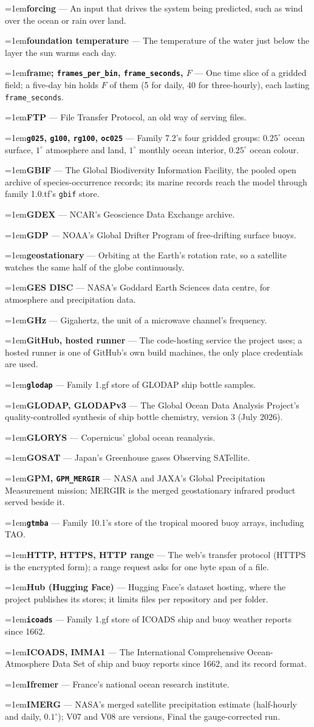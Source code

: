 \documentclass[10pt]{article}
\newcommand{\code}[1]{\texttt{#1}}
\newcommand{\gl}[2]{\par\hangindent=1em\hangafter=1\textbf{#1} --- #2\par}
\begin{document}
\gl{forcing}{An input that drives the system being predicted, such as wind over the ocean or rain over land.}
\gl{foundation temperature}{The temperature of the water just below the layer the sun warms each day.}
\gl{frame; \code{frames\_per\_bin}, \code{frame\_seconds}, $F$}{One time slice of a gridded field; a five-day bin holds $F$ of them (5 for daily, 40 for three-hourly), each lasting \code{frame\_seconds}.}
\gl{FTP}{File Transfer Protocol, an old way of serving files.}
\gl{\code{g025}, \code{g100}, \code{rg100}, \code{oc025}}{Family 7.2's four gridded groups: $0.25^\circ$ ocean surface, $1^\circ$ atmosphere and land, $1^\circ$ monthly ocean interior, $0.25^\circ$ ocean colour.}
\gl{GBIF}{The Global Biodiversity Information Facility, the pooled open archive of species-occurrence records; its marine records reach the model through family 1.0.tf's \code{gbif} store.}
\gl{GDEX}{NCAR's Geoscience Data Exchange archive.}
\gl{GDP}{NOAA's Global Drifter Program of free-drifting surface buoys.}
\gl{geostationary}{Orbiting at the Earth's rotation rate, so a satellite watches the same half of the globe continuously.}
\gl{GES DISC}{NASA's Goddard Earth Sciences data centre, for atmosphere and precipitation data.}
\gl{GHz}{Gigahertz, the unit of a microwave channel's frequency.}
\gl{GitHub, hosted runner}{The code-hosting service the project uses; a hosted runner is one of GitHub's own build machines, the only place credentials are used.}
\gl{\code{glodap}}{Family 1.gf store of GLODAP ship bottle samples.}
\gl{GLODAP, GLODAPv3}{The Global Ocean Data Analysis Project's quality-controlled synthesis of ship bottle chemistry, version 3 (July 2026).}
\gl{GLORYS}{Copernicus' global ocean reanalysis.}
\gl{GOSAT}{Japan's Greenhouse gases Observing SATellite.}
\gl{GPM, \code{GPM\_MERGIR}}{NASA and JAXA's Global Precipitation Measurement mission; MERGIR is the merged geostationary infrared product served beside it.}
\gl{\code{gtmba}}{Family 10.1's store of the tropical moored buoy arrays, including TAO.}
\gl{HTTP, HTTPS, HTTP range}{The web's transfer protocol (HTTPS is the encrypted form); a range request asks for one byte span of a file.}
\gl{Hub (Hugging Face)}{Hugging Face's dataset hosting, where the project publishes its stores; it limits files per repository and per folder.}
\gl{\code{icoads}}{Family 1.gf store of ICOADS ship and buoy weather reports since 1662.}
\gl{ICOADS, IMMA1}{The International Comprehensive Ocean-Atmosphere Data Set of ship and buoy reports since 1662, and its record format.}
\gl{Ifremer}{France's national ocean research institute.}
\gl{IMERG}{NASA's merged satellite precipitation estimate (half-hourly and daily, $0.1^\circ$); V07 and V08 are versions, Final the gauge-corrected run.}
\end{document}
